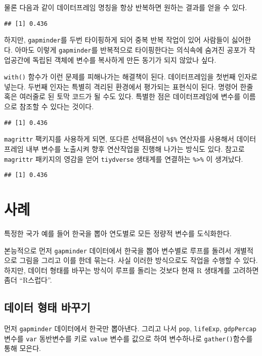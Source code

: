 \documentclass[
]{book}
\begin{document}
물론 다음과 같이 데이터프레임 명칭을 항상 반복하면 원하는 결과를 얻을 수 있다.

\begin{verbatim}
## [1] 0.436
\end{verbatim}

하지만, \texttt{gapminder}를 두번 타이핑하게 되어 중복 반복 작업이 있어
사람들이 싫어한다. 아마도 이렇게 \texttt{gapminder}를 반복적으로 타이핑한다는 의식속에 숨겨진 공포가
작업공간에 독립된 객체에 변수를 복사하게 만든 동기가 되지 않았나 싶다.

\texttt{with()} 함수가 이런 문제를 피해나가는 해결책이 된다.
데이터프레임을 첫번째 인자로 넣는다.
두번째 인자는 특별히 격리된 환경에서 평가되는 표현식이 된다.
명령어 한줄 혹은 여러줄로 된 토막 코드가 될 수도 있다.
특별한 점은 데이터프레임에 변수를 이름으로 참조할 수 있다는 것이다.

\begin{verbatim}
## [1] 0.436
\end{verbatim}

\texttt{magrittr} 팩키지를 사용하게 되면, 또다른 선택욥션이 \texttt{\%\$\%} 연산자를 사용해서 데이터프레임 내부 변수를 노출시켜 향후 연산작업을 진행해 나가는 방식도 있다. 참고로 \texttt{magrittr} 패키지의 영감을 얻어
\texttt{tiydverse} 생태계를 연결하는 \texttt{\%\textgreater{}\%} 이 생겨났다.

\begin{verbatim}
## [1] 0.436
\end{verbatim}

\hypertarget{viz-secret-case-study}{%
\section{사례}\label{viz-secret-case-study}}

특정한 국가 예를 들어 한국을 뽑아 연도별로 모든 정량적 변수를 도식화한다.

본능적으로 먼저 \texttt{gapminder} 데이터에서 한국을 뽑아 변수별로 루프를 돌려서
개별적으로 그림을 그리고 이를 한데 묶는다.
사실 이러한 방식으로도 작업을 수행할 수 있다.
하지만, 데이터 형태를 바꾸는 방식이 루프를 돌리는 것보다 현재 R 생태계를 고려하면 좀더 ``R스럽다''.

\hypertarget{viz-secret-case-study-data}{%
\subsection{데이터 형태 바꾸기}\label{viz-secret-case-study-data}}

먼저 \texttt{gapminder} 데이터에서 한국만 뽑아낸다.
그리고 나서 \texttt{pop}, \texttt{lifeExp}, \texttt{gdpPercap} 변수를 \texttt{var} 동반변수를 키로
\texttt{value} 변수를 값으로 하여 변수하나로 \texttt{gather()}함수를 통해 모은다.
\end{document}
